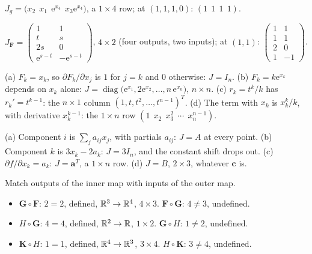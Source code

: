 \begin{solutions}
        $J_{g}=\bigl(x_{2}\ \ x_{1}\ \ \mathrm{e}^{x_{4}}\ \
        x_{3}\mathrm{e}^{x_{4}}\bigr)$, a $1\times4$ row; at $(1,1,1,0)$:
        $(1\ \ 1\ \ 1\ \ 1)$.
  \item $J_{\mathbf{F}}=\begin{pmatrix}1&1\\t&s\\2s&0\\
        \mathrm{e}^{s-t}&-\mathrm{e}^{s-t}\end{pmatrix}$, $4\times2$ (four
        outputs, two inputs); at $(1,1)$:
        $\begin{pmatrix}1&1\\1&1\\2&0\\1&-1\end{pmatrix}$.
  \item (a) $F_{k}=x_{k}$, so $\partial F_{k}/\partial x_{j}$ is $1$ for
        $j=k$ and $0$ otherwise: $J=I_{n}$. (b) $F_{k}=k\mathrm{e}^{x_{k}}$
        depends on $x_{k}$ alone: $J=\operatorname{diag}\bigl(\mathrm{e}^{x_{1}},
        2\mathrm{e}^{x_{2}},\ldots,n\,\mathrm{e}^{x_{n}}\bigr)$, $n\times n$.
        (c) $r_{k}=t^{k}/k$ has $r_{k}'=t^{k-1}$: the $n\times1$ column
        $(1,t,t^{2},\ldots,t^{n-1})^{T}$. (d) The term with $x_{k}$ is
        $x_{k}^{k}/k$, with derivative $x_{k}^{k-1}$: the $1\times n$ row
        $(1\ \ x_{2}\ \ x_{3}^{2}\ \ \cdots\ \ x_{n}^{n-1})$.
  \item (a) Component $i$ is $\sum_{j}a_{ij}x_{j}$, with partials $a_{ij}$:
        $J=A$ at every point. (b) Component $k$ is $3x_{k}-2a_{k}$:
        $J=3I_{n}$, and the constant shift drops out. (c) $\partial f/
        \partial x_{k}=a_{k}$: $J=\mathbf{a}^{T}$, a $1\times n$ row. (d)
        $J=B$, $2\times3$, whatever $\mathbf{c}$ is.
  \item Match outputs of the inner map with inputs of the outer map.
        \begin{itemize}[leftmargin=1.2em,itemsep=0.2ex]
          \item $\mathbf{G}\circ\mathbf{F}$: $2=2$, defined,
                $\mathbb{R}^{3}\to\mathbb{R}^{4}$, $4\times3$. $\mathbf{F}\circ\mathbf{G}$:
                $4\neq3$, undefined.
          \item $H\circ\mathbf{G}$: $4=4$, defined, $\mathbb{R}^{2}\to\mathbb{R}$,
                $1\times2$. $\mathbf{G}\circ H$: $1\neq2$, undefined.
          \item $\mathbf{K}\circ H$: $1=1$, defined, $\mathbb{R}^{4}\to\mathbb{R}^{3}$,
                $3\times4$. $H\circ\mathbf{K}$: $3\neq4$, undefined.

\end{itemize}
\end{solutions}
